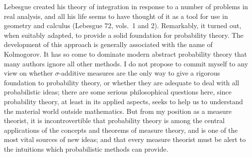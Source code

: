  
\loadeusm 
\def\hatcalBnu{\hat{\Cal B}_{\nu}} 
 
\def\chaptername{Probability theory} 
\def\sectionname{Introduction} 
 
 
Lebesgue created his theory of integration in response to a 
number of problems in real analysis, and all his life seems to have 
thought of it as a tool for use in geometry and calculus  
({\smc Lebesgue 72}, vols.\ 1 and 2).   Remarkably, it 
turned out, when suitably adapted, to provide a solid foundation for 
probability theory.   The development of this approach is generally 
associated with the name of Kolmogorov.   It has so come to 
dominate modern abstract probability theory that many authors ignore all 
other methods.   I do not propose to commit myself to any view on 
whether 
$\sigma$-additive measures are the only way to give a rigorous 
foundation to probability theory, or whether they are adequate to deal 
with all probabilistic ideas;  there are some serious philosophical 
questions here, since probability theory, at least in its applied 
aspects, seeks to help us to understand the material world outside mathematics. 
But from my position as a measure theorist, it is 
incontrovertible that probability theory is among the central 
applications of the concepts and theorems of measure theory, and is one 
of the most vital sources of new ideas;  and that every measure theorist 
must be alert to the intuitions which probabilistic methods can provide. 
 
